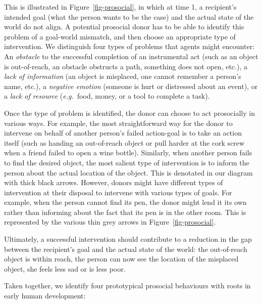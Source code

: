 \documentclass{article}
\newcommand{\eg}{{\textit{e.g.~}}}
\begin{document}
This is illustrated in Figure~\ref{fig-prosocial}, in
which at time 1, a recipient's intended goal (what the person wants to be the
case) and the actual state of the world do not align. A potential prosocial
donor has to be able to identify this problem of a goal-world mismatch, and
then choose an appropriate type of intervention. We distinguish four types of
problems that agents might encounter: An \emph{obstacle} to the successful completion
of an instrumental act (such as an object is out-of-reach, an obstacle
obstructs a path, something does not open, etc.), a \emph{lack of information} (an
object is misplaced, one cannot remember a person's name, etc.), a \emph{negative
emotion} (someone is hurt or distressed about an event), or a \emph{lack of resource}
(\eg food, money, or a tool to complete a task).

Once the type of problem is
identified, the donor can choose to act prosocially in various ways. For
example, the most straightforward way for the donor to intervene on behalf of
another person's failed action-goal is to take an action itself (such as
handing an out-of-reach object or pull harder at the cork screw when a friend
failed to open a wine bottle). Similarly, when another person fails to find
the desired object, the most salient type of intervention is to inform the
person about the actual location of the object. This is denotated in our
diagram with thick black arrows. However, donors might have different types of
intervention at their disposal to intervene with various types of goals. For
example, when the person cannot find its pen, the donor might lend it its own
rather than informing about the fact that its pen is in the other room.
This is represented by the various thin grey arrows in
Figure~\ref{fig-prosocial}.

Ultimately, a successful intervention should
contribute to a reduction in the gap between the recipient's goal and the
actual state of the world: the out-of-reach object is within reach, the person
can now see the location of the misplaced object, she feels less sad or is less
poor.

Taken together, we identify four prototypical prosocial behaviours with roots in
early human development: 
\end{document}
